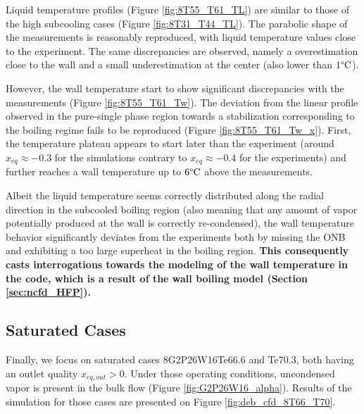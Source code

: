\npar

Liquid temperature profiles (Figure \ref{fig:8T55_T61_TL}) are similar to those of the high subcooling cases (Figure \ref{fig:8T31_T44_TL}). The parabolic shape of the measurements is reasonably reproduced, with liquid temperature values close to the experiment. The same discrepancies are observed, namely a overestimation close to the wall and a small underestimation at the center (also lower than $1\degree\mathrm{C}$).

\npar

However, the wall temperature start to show significant discrepancies with the measurements (Figure \ref{fig:8T55_T61_Tw}). The deviation from the linear profile observed in the pure-single phase region towards a stabilization corresponding to the boiling regime fails to be reproduced (Figure \ref{fig:8T55_T61_Tw_x}). First, the temperature plateau appears to start later than the experiment (around $x_{eq}\approx -0.3$ for the simulations contrary to $x_{eq} \approx -0.4$ for the experiments) and further reaches a wall temperature up to $6 \degree\mathrm{C}$ above the measurements.

\npar
Albeit the liquid temperature seems correctly distributed along the radial direction in the subcooled boiling region (also meaning that any amount of vapor potentially produced at the wall is correctly re-condensed), the wall temperature behavior significantly deviates from the experiments both by missing the ONB and exhibiting a too large superheat in the boiling region. \textbf{This consequently casts interrogations towards the modeling of the wall temperature in the code, which is a result of the wall boiling model (Section \ref{sec:ncfd_HFP}).}



\subsection{Saturated Cases}

Finally, we focus on saturated cases 8G2P26W16Te66.6 and Te70.3, both having an outlet quality $x_{eq,out} > 0$. Under those operating conditions, uncondensed vapor is present in the bulk flow (Figure \ref{fig:G2P26W16_alpha}). Results of the simulation for those cases are presented on Figure \ref{fig:deb_cfd_8T66_T70}.



